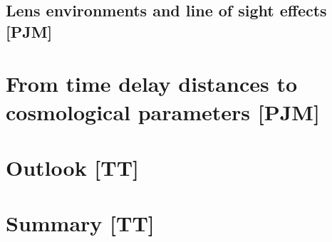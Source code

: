 


\subsection{Lens environments and line of sight effects [PJM]}
\label{sec:measurement:los}




\section{From time delay distances to cosmological parameters [PJM]}
\label{sec:cosmo}




\section{Outlook [TT]}
\label{sec:outlook}




\section{Summary [TT]}
\label{sec:summary}





